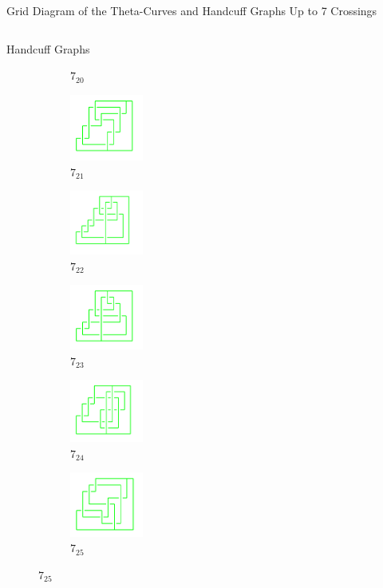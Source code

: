 \documentclass[final]{beamer}
\begin{document}
\begin{frame}[t]
\begin{alertblock}{Grid Diagram of the Theta-Curves and Handcuff Graphs Up to 7 Crossings}
\begin{columns}[t]
\begin{column}{0.3\textwidth}
\begin{alertblock}{Handcuff Graphs}
\begin{figure}
\begin{subfigure}{0.15\textwidth}
    \caption{$7_{20}$} 
    \end{subfigure}
    \begin{subfigure}{0.15\textwidth}
    \includegraphics[width=2.4cm]{../Midterm_Poster/grid_diagram/handcuff_7_21.png}
    \caption{$7_{21}$} 
    \end{subfigure}
    \begin{subfigure}{0.15\textwidth}
    \includegraphics[width=2.4cm]{../Midterm_Poster/grid_diagram/handcuff_7_22.png}
    \caption{$7_{22}$} 
    \end{subfigure}
    \begin{subfigure}{0.15\textwidth}
    \includegraphics[width=2.4cm]{../Midterm_Poster/grid_diagram/handcuff_7_23.png}
    \caption{$7_{23}$} 
    \end{subfigure}
    \begin{subfigure}{0.15\textwidth}
    \includegraphics[width=2.4cm]{../Midterm_Poster/grid_diagram/handcuff_7_24.png}
    \caption{$7_{24}$} 
    \end{subfigure}
    \begin{subfigure}{0.15\textwidth}
    \includegraphics[width=2.4cm]{../Midterm_Poster/grid_diagram/handcuff_7_25.png}
    \caption{$7_{25}$} 
    \end{subfigure}

\end{figure}
\end{alertblock}
\end{column}
\end{columns}
\end{alertblock}
\end{frame}
\end{document}
